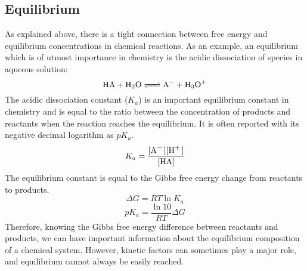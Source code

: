 \subsection*{Equilibrium}
As explained above, there is a tight connection between free energy and equilibrium concentrations in chemical reactions. As an example, an equilibrium which is of utmost importance in chemistry is the acidic dissociation of species in aqueous solution:
\[
\ce{HA + H2O <=> A- + H3O+}
\]
The acidic dissociation constant ($K_a$) is an important equilibrium constant in chemistry and is equal to the ratio between the concentration of products and reactants when the reaction reaches the equilibrium. It is often reported with its negative decimal logarithm as $pK_a$.
\[
K_a=\dfrac{\ce{[A- ][H+ ]}}{\ce{[HA]}} 
\]
The equilibrium constant is equal to the Gibbs free energy change from reactants to products.
\[
\Delta G = RT \ln K_a
\]
\[
pK_a = \dfrac{\ln 10}{RT} \Delta G
\]
Therefore, knowing the Gibbs free energy difference between reactants and products, we can have important information about the equilibrium composition of a chemical system. However, kinetic factors can sometimes play a major role, and equilibrium cannot always be easily reached.

